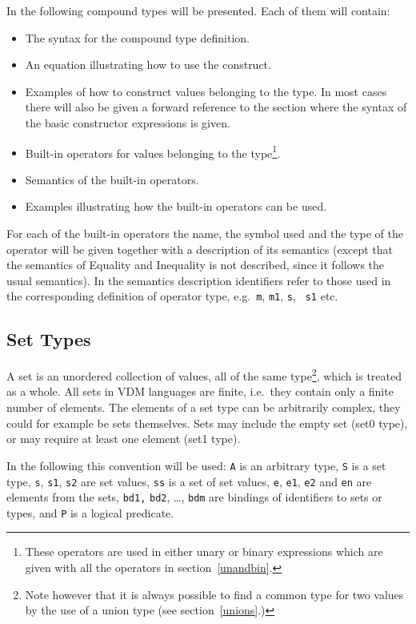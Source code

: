 \documentclass{overturerepchap}
\begin{document}
In the following compound types will be presented. Each of
them will contain:
\begin{itemize}
\item The syntax for the compound type definition.
\item An equation illustrating how to use the construct.
\item Examples of how to construct values belonging to the type. In
  most cases there will also be given a forward reference to the
  section where the syntax of the basic constructor expressions is given.
\item Built-in operators for values belonging to the
  type\footnote{These operators are used in either unary or binary
    expressions which are given with all the operators in
    section~\ref{unandbin}.}.
\item Semantics of the built-in operators.
\item Examples illustrating how the built-in operators can be used.
\end{itemize}
For each of the built-in operators the name, the symbol used and the
type of the operator will be given together with a description of its
semantics (except that the semantics of Equality and Inequality is not
described, since it follows the usual semantics). In the semantics
description identifiers refer to those used in the corresponding
definition of operator type, e.g.\ {\tt m}, {\tt m1}, {\tt s}, {\tt
  s1} etc.

\subsection{Set Types}
\label{sets}

A set is an unordered collection of values, all of the same
type\footnote{Note however that it is always possible to find a common
  type for two values by the use of a union type (see
  section~\ref{unions}.)}, which is treated as a whole. All sets in
VDM languages are finite, i.e.\ they contain only a finite
number of elements. The elements of a set type can be arbitrarily
complex, they could for example be sets themselves. Sets may include the
empty set (set0 type), or may require at least one element (set1 type).

In the following this convention will be used: {\tt A} is an arbitrary
type, {\tt S} is a set type, {\tt s}, {\tt s1}, {\tt s2} are set
values, {\tt ss} is a set of set values, {\tt e}, {\tt e1}, {\tt e2}
and {\tt en} are elements from the sets, {\tt bd1,} {\tt bd2}, \ldots,
{\tt bdm} are bindings of identifiers to sets or types, and {\tt P} is
a logical predicate.
\end{document}
